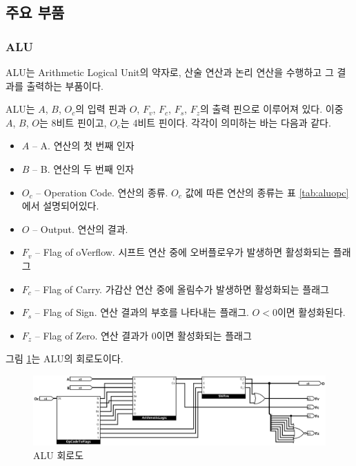 \documentclass{article}
\renewcommand{\figurename}{그림}
\renewcommand{\tablename}{표}
\begin{document}
\pagebreak

\subsection{주요 부품}

\subsubsection{ALU}

ALU는 Arithmetic Logical Unit의 약자로,
산술 연산과 논리 연산을 수행하고 그 결과를 출력하는 부품이다.

ALU는 $A$, $B$, $O_c$의 입력 핀과
$O$, $F_v$, $F_c$, $F_s$, $F_z$의 출력 핀으로 이루어져 있다.
이중 $A$, $B$, $O$는 8비트 핀이고, $O_c$는 4비트 핀이다.
각각이 의미하는 바는 다음과 같다.

\begin{itemize}
    \item $A$ -- A. 연산의 첫 번째 인자
    \item $B$ -- B. 연산의 두 번째 인자
    \item $O_c$ -- Operation Code. 연산의 종류.
        $O_c$ 값에 따른 연산의 종류는 \tablename{} \ref{tab:aluopc}에서 설명되어있다.
    \item $O$ -- Output. 연산의 결과.
    \item $F_v$ -- Flag of oVerflow. 시프트 연산 중에 오버플로우가 발생하면
        활성화되는 플래그
    \item $F_c$ -- Flag of Carry. 가감산 연산 중에 올림수가 발생하면
        활성화되는 플래그
    \item $F_s$ -- Flag of Sign. 연산 결과의 부호를 나타내는 플래그.
        $O < 0$이면 활성화된다.
    \item $F_z$ -- Flag of Zero. 연산 결과가 $0$이면 활성화되는 플래그
\end{itemize}

\figurename{} \ref{fig:alu}는 ALU의 회로도이다.

\begin{figure}[h]
    \centering
    \includegraphics[scale=0.25]{ALU}
    \caption{ALU 회로도}
    \label{fig:alu}
\end{figure}
\end{document}
